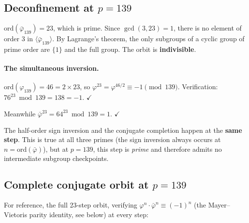\documentclass[12pt,oneside]{article}
\theoremstyle{principia}
\theoremstyle{definition}
\theoremstyle{remark}
\begin{document}
\subsection{Deconfinement at $p = 139$}

$\mathrm{ord}(\bar\varphi_{139}) = 23$, which is prime.
Since $\gcd(3, 23) = 1$, there is no element of order 3 in
$\langle\bar\varphi_{139}\rangle$. By Lagrange's theorem, the
only subgroups of a cyclic group of prime order are $\{1\}$ and
the full group. The orbit is \textbf{indivisible}.

\paragraph{The simultaneous inversion.}
$\mathrm{ord}(\varphi_{139}) = 46 = 2 \times 23$, so
$\varphi^{23} = \varphi^{46/2} \equiv -1 \pmod{139}$.
Verification: $76^{23} \bmod 139 = 138 = -1$. $\checkmark$

Meanwhile $\bar\varphi^{23} = 64^{23} \bmod 139 = 1$. $\checkmark$

The half-order sign inversion and the conjugate completion happen at the
\textbf{same step}. This is true at all three primes (the sign inversion
always occurs at $n = \mathrm{ord}(\bar\varphi)$), but at $p = 139$,
this step is \emph{prime} and therefore admits no intermediate
subgroup checkpoints.

\subsection{Complete conjugate orbit at $p = 139$}

For reference, the full 23-step orbit, verifying
$\varphi^n \cdot \bar\varphi^n \equiv (-1)^n$ (the Mayer--Vietoris
parity identity, see below) at every step:
\end{document}
